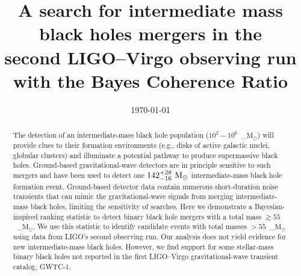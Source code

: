 \documentclass[%
 nofootinbib,
 amsmath,amssymb,
 aps,
 twocolumn,
 superscriptaddress
]{revtex4-2}
\newcommand{\mathcmd}[1]{{\sc \relax\ifmmode#1\else $#1$\fi}\xspace}
\newcommand{\msun}{\mathcmd{\text{M}_\odot}}
\newcommand{\avi}[1]{\textcolor{orange}{[AV: #1]}}
\begin{document}
\title{A search for intermediate mass black holes mergers in the \\second LIGO--Virgo observing run with the Bayes Coherence Ratio}




\date{\today}


\begin{abstract}
The detection of an intermediate-mass black hole population ($10^2-10^6$~\msun) will provide clues to their formation environments (e.g., disks of active galactic nuclei, globular clusters) and illuminate a potential pathway to produce supermassive black holes. Ground-based gravitational-wave detectors are in principle sensitive to such mergers and have been used to detect one $142^{+28}_{-16}\ \msun$ intermediate-mass black hole formation event. Ground-based detector data contain numerous short-duration noise transients that can mimic the gravitational-wave signals from merging intermediate-mass black holes, limiting the sensitivity of searches. Here we demonstrate a Bayesian-inspired ranking statistic to detect binary black hole mergers with a total mass $\gtrsim55$~\msun. We use this statistic to identify candidate events with total masses $>55$~\msun using data from LIGO's second observing run. Our analysis does not yield evidence for new intermediate-mass black holes. However, we find support for some stellar-mass binary black holes not reported in the first LIGO--Virgo gravitational-wave transient catalog, GWTC-1.
\end{abstract}



\maketitle

\end{document}
